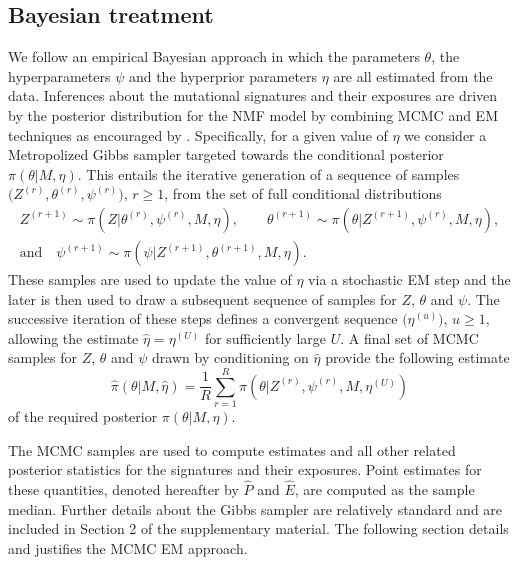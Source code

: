 \documentclass{bioinfo}
\begin{document}
\subsection{Bayesian treatment}
We follow an empirical Bayesian approach in which the parameters
$\theta$, the hyperparameters $\psi$ and the hyperprior parameters
$\eta$ are all estimated from the data.  Inferences about the
mutational signatures and their exposures are driven by the posterior
distribution for the NMF model by combining MCMC and EM techniques as
encouraged by \cite{C01}. Specifically, for a given value of $\eta$ we
consider a Metropolized Gibbs sampler targeted towards the conditional
posterior $\pi(\theta|M, \eta)$. This entails the iterative generation
of a sequence of samples $\big(Z^{(r)}, \theta^{(r)},
\psi^{(r)}\big)$, $r \geq 1$, from the set of full conditional
distributions
\begin{gather*}
   Z^{(r+1)} \sim \pi(Z| \theta^{(r)}, \psi^{(r)}, M, \eta), \qquad
   \theta^{(r+1)} \sim \pi(\theta| Z^{(r+1)}, \psi^{(r)}, M, \eta), \\
       \text{and}\quad
   \psi^{(r+1)} \sim \pi(\psi| Z^{(r+1)}, \theta^{(r+1)}, M, \eta).
\end{gather*}
These samples are used to update the value of $\eta$ via a stochastic
EM step and the later is then used to draw a subsequent sequence of
samples for $Z$, $\theta$ and $\psi$. The successive iteration of
these steps defines a convergent sequence $\big(\eta^{(u)}\big)$, $u
\geq 1$, allowing the estimate $\hat\eta = \eta^{(U)}$ for
sufficiently large $U$. A final set of MCMC samples for $Z$, $\theta$
and $\psi$ drawn by conditioning on $\hat\eta$ provide the following
estimate
\begin{equation}
 \label{eqn:MCEM_estimate}
   \widehat{\pi}(\theta|M, \hat\eta)
 = 
   \frac{1}{R}\sum_{r=1}^R \pi(\theta|Z^{(r)}, \psi^{(r)}, M,
   \eta^{(U)})
\end{equation}
of the required posterior $\pi(\theta|M, \eta)$.


The MCMC samples are used to compute estimates and all other related
posterior statistics for the signatures and their exposures. Point
estimates for these quantities, denoted hereafter by $\widehat P$ and
$\widehat E$, are computed as the sample median. Further details about
the Gibbs sampler are relatively standard and are included in Section
2 of the supplementary material. The following section details and
justifies the MCMC EM approach.
\end{document}
